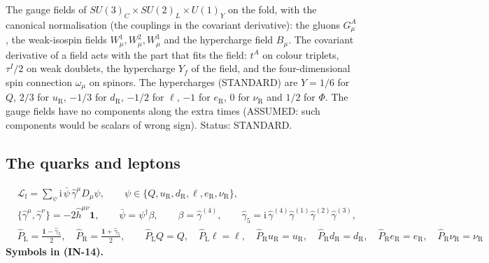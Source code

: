 \documentclass[
  10pt,
]{article}
\begin{document}
The gauge fields of \(SU(3)_C \times SU(2)_L \times U(1)_Y\) on the
fold, with the canonical normalisation (the couplings in the covariant
derivative): the gluons \(G^A_\mu\), the weak-isospin fields
\(W^1_\mu, W^2_\mu, W^3_\mu\) and the hypercharge field \(B_\mu\). The
covariant derivative of a field acts with the part that fits the field:
\(t^A\) on colour triplets, \(\tau^I/2\) on weak doublets, the
hypercharge \(Y_f\) of the field, and the four-dimensional spin
connection \(\hat\omega_\mu\) on spinors. The hypercharges (STANDARD)
are \(Y = 1/6\) for \(Q\), \(2/3\) for \(u_{\mathrm{R}}\), \(-1/3\) for
\(d_{\mathrm{R}}\), \(-1/2\) for \(\ell\), \(-1\) for
\(e_{\mathrm{R}}\), \(0\) for \(\nu_{\mathrm{R}}\) and \(1/2\) for
\(\Phi\). The gauge fields have no components along the extra times
(ASSUMED: such components would be scalars of wrong sign). Status:
STANDARD.

\hypertarget{the-quarks-and-leptons}{%
\subsection{The quarks and leptons}\label{the-quarks-and-leptons}}

\[
\begin{aligned}
&\mathcal{L}_{\mathrm{f}} = \sum_{\psi}\mathrm{i}\,\bar\psi\,\hat\gamma^\mu D_\mu\psi,\qquad
 \psi \in \{Q, u_{\mathrm{R}}, d_{\mathrm{R}}, \ell, e_{\mathrm{R}}, \nu_{\mathrm{R}}\},\\
&\{\hat\gamma^\mu, \hat\gamma^\nu\} = -2\hat h^{\mu\nu}\mathbf{1},\qquad \bar\psi = \psi^\dagger\beta,\qquad
 \beta = \hat\gamma^{(4)},\qquad \hat\gamma_5 = \mathrm{i}\,\hat\gamma^{(4)}\hat\gamma^{(1)}\hat\gamma^{(2)}\hat\gamma^{(3)},\\
&\hat P_{\mathrm{L}} = \frac{\mathbf{1} - \hat\gamma_5}{2},\quad \hat P_{\mathrm{R}} = \frac{\mathbf{1} + \hat\gamma_5}{2},\qquad
 \hat P_{\mathrm{L}}Q = Q,\quad \hat P_{\mathrm{L}}\ell = \ell,\quad \hat P_{\mathrm{R}}u_{\mathrm{R}} = u_{\mathrm{R}},\quad
 \hat P_{\mathrm{R}}d_{\mathrm{R}} = d_{\mathrm{R}},\quad \hat P_{\mathrm{R}}e_{\mathrm{R}} = e_{\mathrm{R}},\quad
 \hat P_{\mathrm{R}}\nu_{\mathrm{R}} = \nu_{\mathrm{R}}
\end{aligned} \tag{IN-14}
\] \textbf{Symbols in (IN-14).}
\end{document}
